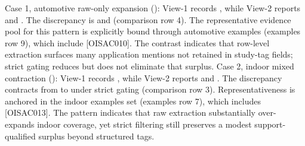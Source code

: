 {}
\markdownRendererSectionEnd \markdownRendererSectionBegin
{}\markdownRendererInterblockSeparator
{}Case 1, automotive raw-only expansion (): View-1 records , while View-2 reports  and . The discrepancy is  and  (comparison row \markdownRendererHash{}4). The representative evidence pool for this pattern is explicitly bound through automotive  examples (examples row \markdownRendererHash{}9), which include  [O\markdownRendererUnderscore{}ISAC\markdownRendererUnderscore{}010]. The contrast indicates that row-level extraction surfaces many application mentions not retained in study-tag fields; strict gating reduces but does not eliminate that surplus.\markdownRendererParagraphSeparator
{}Case 2, indoor mixed contraction (): View-1 records , while View-2 reports  and . The discrepancy contracts from  to  under strict gating (comparison row \markdownRendererHash{}3). Representativeness is anchored in the indoor  examples set (examples row \markdownRendererHash{}7), which includes  [O\markdownRendererUnderscore{}ISAC\markdownRendererUnderscore{}013]. The pattern indicates that raw extraction substantially over-expands indoor coverage, yet strict filtering still preserves a modest support-qualified surplus beyond structured tags.\markdownRendererParagraphSeparator
